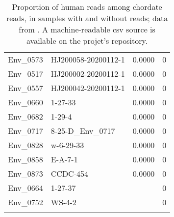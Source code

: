 \begin{longtable}{llrr}
  Env\_0573 & HJ200058-20200112-1 & 0.0000 &     0 \\ 
  Env\_0517 & HJ200002-20200112-1 & 0.0000 &     0 \\ 
  Env\_0557 & HJ200042-20200112-1 & 0.0000 &     0 \\ 
  Env\_0660 & 1-27-33 & 0.0000 &     0 \\ 
  Env\_0682 & 1-29-4 & 0.0000 &     0 \\ 
  Env\_0717 & 8-25-D\_Env\_0717 & 0.0000 &     0 \\ 
  Env\_0828 & w-6-29-33 & 0.0000 &     0 \\ 
  Env\_0858 & E-A-7-1 & 0.0000 &     0 \\ 
  Env\_0873 & CCDC-454 & 0.0000 &     0 \\ 
  Env\_0664 & 1-27-37 &  &     0 \\ 
  Env\_0752 & WS-4-2 &  &     0 \\ 
   \hline
\hline
\caption{Proportion of human reads among chordate reads, in samples with and without \sct{} reads; data from \citet{Bloom2023VE}. A machine-readable csv source is available on the projet's repository.} 
\label{tab:propHuman}
\end{longtable}
